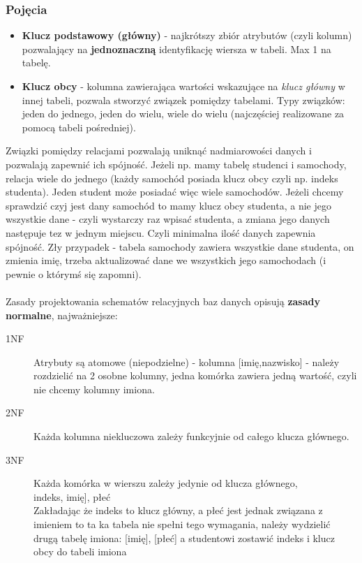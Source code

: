 \documentclass[a4paper,twoside]{report}
\begin{document}
\subsubsection{Pojęcia}
\begin{itemize}
	\item \textbf{Klucz podstawowy (główny)} - najkrótszy zbiór atrybutów (czyli kolumn) pozwalający na \textbf{jednoznaczną} identyfikację wiersza w tabeli. Max 1 na tabelę.
	\item \textbf{Klucz obcy} - kolumna zawierająca wartości wskazujące na \textit{klucz główny} w innej tabeli, pozwala stworzyć związek pomiędzy tabelami. Typy związków: jeden do jednego, jeden do wielu, wiele do wielu (najczęściej realizowane za pomocą tabeli pośredniej).
\end{itemize}
Związki pomiędzy relacjami pozwalają uniknąć nadmiarowości danych i pozwalają zapewnić ich spójność. Jeżeli np. mamy tabelę studenci i samochody, relacja wiele do jednego (każdy samochód posiada klucz obcy czyli np. indeks studenta). Jeden student może posiadać więc wiele samochodów. Jeżeli chcemy sprawdzić czyj jest dany samochód to mamy klucz obcy studenta, a nie jego wszystkie dane - czyli wystarczy raz wpisać studenta, a zmiana jego danych następuje tez w jednym miejscu. Czyli minimalna ilość danych zapewnia spójność. Zły przypadek - tabela samochody zawiera wszystkie dane studenta, on zmienia imię, trzeba aktualizować dane we wszystkich jego samochodach (i pewnie o którymś się zapomni).\\\\
Zasady projektowania schematów relacyjnych baz danych opisują \textbf{zasady normalne}, najważniejsze:
\begin{description}
\item[1NF] Atrybuty są atomowe (niepodzielne) - kolumna [imię,nazwisko] - należy rozdzielić na 2 osobne kolumny, jedna komórka zawiera jedną wartość, czyli nie chcemy kolumny imiona.
\item[2NF] Każda kolumna niekluczowa zależy funkcyjnie od całego klucza głównego.
\item[3NF] Każda komórka w wierszu zależy jedynie od klucza głównego, \\
\lbrack indeks\rbrack, \lbrack imię\rbrack], \lbrack płeć\rbrack  \\
Zakładając że indeks to klucz główny, a płeć jest jednak związana z imieniem to ta ka tabela nie spełni tego wymagania, należy wydzielić drugą tabelę imiona: [imię], [płeć] a studentowi zostawić indeks i klucz obcy do tabeli imiona
\end{description}
\end{document}
